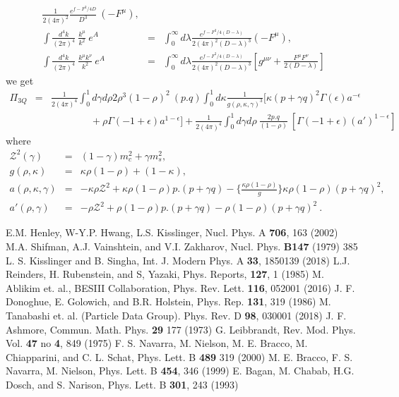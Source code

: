 \documentclass[twoside]{article}
\begin{document}
\begin{appendix}
\begin{eqnarray}
\frac{1}{2(4 \pi)^2} \frac{e^{f - F^2/4D}}{D^3}~(-F^\mu),\\
\int \frac{d^4 k}{(2\pi)^4} ~\frac{k^\mu}{k^2}~ e^A &=& \int_0^\infty d \lambda \frac{e^{f - F^2/4(D- \lambda)}}{2(4 \pi)^2(D-\lambda)^3} \left( -F^\mu \right), \\
\int \frac{d^4 k}{(2\pi)^4} ~\frac{k^\mu k^\nu}{k^2}~ e^A &=&
\int_0^\infty d \lambda \frac{e^{f - F^2/4(D-\lambda)}}{2(4 \pi)^2(D-\lambda)^3} \left[
g^{\mu \nu} + \frac{F^\mu F^\nu}{2(D- \lambda)}
\right]
\end{eqnarray}
we get
\begin{eqnarray}
\Pi_{3Q}
&=&
\frac{1}{2(4 \pi)^4}
\int_0^1 d \gamma d \rho 2 \rho^3 (1 - \rho)^2~(p.q) \int_0^1 d \kappa \frac{1}{g(\rho, \kappa, \gamma)^3}\Big[
\kappa (p+ \gamma q)^2 \Gamma(\epsilon) a^{-\epsilon} \nonumber\\&&
\qquad \qquad + \rho \Gamma(-1 + \epsilon)a^{1 - \epsilon}
\Big]
+ \frac{1}{2(4 \pi)^4} \int_0^1 d \gamma d \rho~ \frac{2p.q}{(1- \rho)}~ \left[ \Gamma(-1 + \epsilon)(a')^{1 - \epsilon} \right]
\end{eqnarray}
where
\begin{eqnarray}
{\mathcal{Z}}^2(\gamma) &=& (1 - \gamma)m_c^2 + \gamma m_s^2, \\
g(\rho, \kappa) &=&\kappa \rho(1 - \rho)+ (1 - \kappa), \\
a(\rho, \kappa, \gamma) &=& - \kappa \rho {\mathcal{Z}}^2 + \kappa \rho (1 - \rho) p.(p+ \gamma q) - \Big\{ \frac{\kappa \rho (1 - \rho)}{g} \Big\} \kappa \rho (1 - \rho) (p+ \gamma q)^2, \\
a'(\rho, \gamma) &=& - \rho {\mathcal{Z}}^2 + \rho (1 - \rho) p.(p+ \gamma q) -
 \rho (1 - \rho) (p + \gamma q)^2 ~.
\end{eqnarray}
\end{appendix}


\begin{thebibliography}{99}
 E.M. Henley, W-Y.P. Hwang,  L.S. Kisslinger, Nucl. Phys. A
{\bf 706}, 163 (2002)
 M.A. Shifman, A.J. Vainshtein, and V.I. Zakharov, Nucl. Phys. 
{\bf B147} (1979) 385
 L. S. Kisslinger and B. Singha, Int. J. Modern Phys. A {\bf 33},
1850139 (2018)
 L.J. Reinders, H. Rubenstein, and S, Yazaki, Phys. Reports,
{\bf 127}, 1 (1985)
 M. Ablikim et. al., BESIII Collaboration, Phys. Rev. Lett.
{\bf 116}, 052001 (2016)
 J. F. Donoghue, E. Golowich, and B.R. Holstein, Phys. Rep.
{\bf 131}, 319 (1986)
 M. Tanabashi et. al. (Particle Data Group). Phys. Rev. D 
\textbf{98}, 030001 
(2018)
J. F. Ashmore, Commun. Math. Phys. \textbf{29} 177 (1973)
G. Leibbrandt, Rev. Mod. Phys. Vol. \textbf{47} no \textbf{4}, 849 (1975)
F. S. Navarra, M. Nielson, M. E. Bracco, M. Chiapparini, and C. L. Schat, Phys.
 Lett. B \textbf{489} 319 (2000)
M. E. Bracco, F. S. Navarra, M. Nielson, Phys. Lett. B \textbf{454}, 346 (1999) 
E. Bagan, M. Chabab, H.G. Dosch, and S. Narison, Phys. Lett. B \textbf{301},
 243 (1993)

\end{thebibliography}
\end{document}
